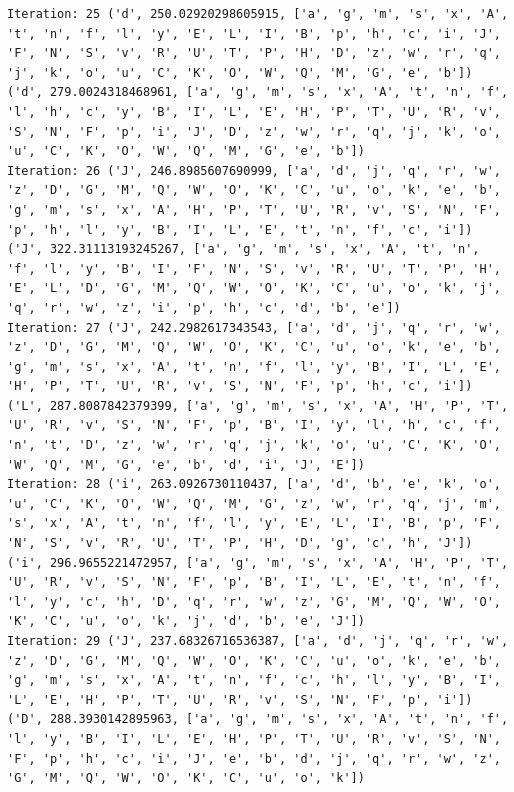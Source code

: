 \documentclass[11pt]{article}
\begin{document}
\begin{lstlisting}
Iteration: 25 ('d', 250.02920298605915, ['a', 'g', 'm', 's', 'x', 'A', 't', 'n', 'f', 'l', 'y', 'E', 'L', 'I', 'B', 'p', 'h', 'c', 'i', 'J', 'F', 'N', 'S', 'v', 'R', 'U', 'T', 'P', 'H', 'D', 'z', 'w', 'r', 'q', 'j', 'k', 'o', 'u', 'C', 'K', 'O', 'W', 'Q', 'M', 'G', 'e', 'b']) ('d', 279.0024318468961, ['a', 'g', 'm', 's', 'x', 'A', 't', 'n', 'f', 'l', 'h', 'c', 'y', 'B', 'I', 'L', 'E', 'H', 'P', 'T', 'U', 'R', 'v', 'S', 'N', 'F', 'p', 'i', 'J', 'D', 'z', 'w', 'r', 'q', 'j', 'k', 'o', 'u', 'C', 'K', 'O', 'W', 'Q', 'M', 'G', 'e', 'b'])
Iteration: 26 ('J', 246.8985607690999, ['a', 'd', 'j', 'q', 'r', 'w', 'z', 'D', 'G', 'M', 'Q', 'W', 'O', 'K', 'C', 'u', 'o', 'k', 'e', 'b', 'g', 'm', 's', 'x', 'A', 'H', 'P', 'T', 'U', 'R', 'v', 'S', 'N', 'F', 'p', 'h', 'l', 'y', 'B', 'I', 'L', 'E', 't', 'n', 'f', 'c', 'i']) ('J', 322.31113193245267, ['a', 'g', 'm', 's', 'x', 'A', 't', 'n', 'f', 'l', 'y', 'B', 'I', 'F', 'N', 'S', 'v', 'R', 'U', 'T', 'P', 'H', 'E', 'L', 'D', 'G', 'M', 'Q', 'W', 'O', 'K', 'C', 'u', 'o', 'k', 'j', 'q', 'r', 'w', 'z', 'i', 'p', 'h', 'c', 'd', 'b', 'e'])
Iteration: 27 ('J', 242.2982617343543, ['a', 'd', 'j', 'q', 'r', 'w', 'z', 'D', 'G', 'M', 'Q', 'W', 'O', 'K', 'C', 'u', 'o', 'k', 'e', 'b', 'g', 'm', 's', 'x', 'A', 't', 'n', 'f', 'l', 'y', 'B', 'I', 'L', 'E', 'H', 'P', 'T', 'U', 'R', 'v', 'S', 'N', 'F', 'p', 'h', 'c', 'i']) ('L', 287.8087842379399, ['a', 'g', 'm', 's', 'x', 'A', 'H', 'P', 'T', 'U', 'R', 'v', 'S', 'N', 'F', 'p', 'B', 'I', 'y', 'l', 'h', 'c', 'f', 'n', 't', 'D', 'z', 'w', 'r', 'q', 'j', 'k', 'o', 'u', 'C', 'K', 'O', 'W', 'Q', 'M', 'G', 'e', 'b', 'd', 'i', 'J', 'E'])
Iteration: 28 ('i', 263.0926730110437, ['a', 'd', 'b', 'e', 'k', 'o', 'u', 'C', 'K', 'O', 'W', 'Q', 'M', 'G', 'z', 'w', 'r', 'q', 'j', 'm', 's', 'x', 'A', 't', 'n', 'f', 'l', 'y', 'E', 'L', 'I', 'B', 'p', 'F', 'N', 'S', 'v', 'R', 'U', 'T', 'P', 'H', 'D', 'g', 'c', 'h', 'J']) ('i', 296.9655221472957, ['a', 'g', 'm', 's', 'x', 'A', 'H', 'P', 'T', 'U', 'R', 'v', 'S', 'N', 'F', 'p', 'B', 'I', 'L', 'E', 't', 'n', 'f', 'l', 'y', 'c', 'h', 'D', 'q', 'r', 'w', 'z', 'G', 'M', 'Q', 'W', 'O', 'K', 'C', 'u', 'o', 'k', 'j', 'd', 'b', 'e', 'J'])
Iteration: 29 ('J', 237.68326716536387, ['a', 'd', 'j', 'q', 'r', 'w', 'z', 'D', 'G', 'M', 'Q', 'W', 'O', 'K', 'C', 'u', 'o', 'k', 'e', 'b', 'g', 'm', 's', 'x', 'A', 't', 'n', 'f', 'c', 'h', 'l', 'y', 'B', 'I', 'L', 'E', 'H', 'P', 'T', 'U', 'R', 'v', 'S', 'N', 'F', 'p', 'i']) ('D', 288.3930142895963, ['a', 'g', 'm', 's', 'x', 'A', 't', 'n', 'f', 'l', 'y', 'B', 'I', 'L', 'E', 'H', 'P', 'T', 'U', 'R', 'v', 'S', 'N', 'F', 'p', 'h', 'c', 'i', 'J', 'e', 'b', 'd', 'j', 'q', 'r', 'w', 'z', 'G', 'M', 'Q', 'W', 'O', 'K', 'C', 'u', 'o', 'k'])

\end{lstlisting}
\end{document}
